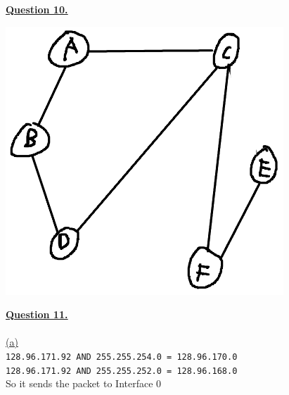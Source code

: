 \documentclass[12pt]{article}
\begin{document}
\newpage

\hyperlink{toc}{\hypertarget{10}{\LARGE \underline{\textbf{Question 10.}}}}\\
\begin{center}
	\includegraphics[width=\textwidth]{cscd58-a2-q10.png}
\end{center}
\newpage

\hyperlink{toc}{\LARGE \underline{\textbf{Question 11.}}}\\
~\\\hyperlink{toc}{\hypertarget{11.1}{(a)}}\\
\texttt{128.96.171.92 AND 255.255.254.0 = 128.96.170.0}\\
\texttt{128.96.171.92 AND 255.255.252.0 = 128.96.168.0}\\
So it sends the packet to Interface 0\\
\end{document}
